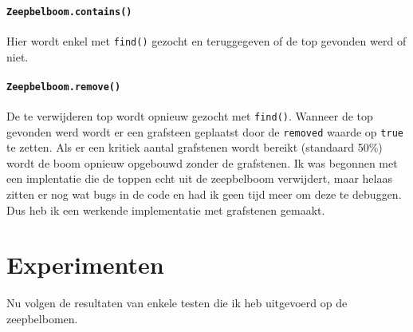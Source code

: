 \documentclass[12pt,hidelinks]{article}
\begin{document}
    \subsection{\tt Zeepbelboom.contains()}
    Hier wordt enkel met {\tt find()} gezocht en teruggegeven of de top gevonden werd
    of niet.
    \subsection{\tt Zeepbelboom.remove()}
    De te verwijderen top wordt opnieuw gezocht met {\tt find()}. Wanneer de top gevonden
    werd wordt er een grafsteen geplaatst door de {\tt removed} waarde op {\tt true} te
    zetten. Als er een kritiek aantal grafstenen wordt bereikt (standaard 50\%) wordt
    de boom opnieuw opgebouwd zonder de grafstenen.
    \newline \newline
    Ik was begonnen met een implentatie die de toppen echt uit de zeepbelboom verwijdert,
    maar helaas zitten er nog wat bugs in de code en had ik geen tijd meer om deze te
    debuggen. Dus heb ik een werkende implementatie met grafstenen gemaakt.



    \newpage
    \part*{Experimenten}
    Nu volgen de resultaten van enkele testen die ik heb uitgevoerd op de zeepbelbomen.
    
\end{document}
